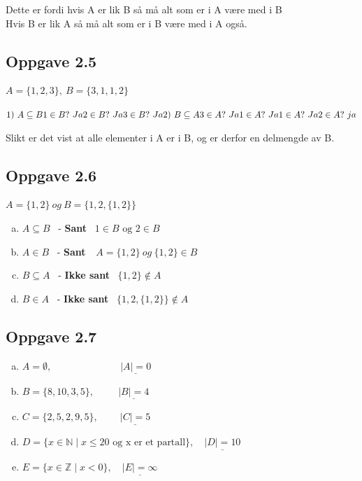 \documentclass{article}
\begin{document}
Dette er fordi hvis A er lik B så må alt som er i A være med i  B\\
Hvis B er lik A så må alt som er i B være med i A også.\\

\subsection*{Oppgave 2.5}

\(A = \{1, 2, 3\}, \  B = \{3, 1, 1, 2\}\)

\(
1) \ A \subseteq B \\ \\
1 \in B ? \ Ja \\
2 \in B ? \ Ja \\
3 \in B ? \ Ja \\ \\
2) \ B \subseteq A \\ \\
3 \in A ? \ Ja \\
1 \in A ? \ Ja \\
1 \in A ? \ Ja \\
2 \in A ? \ ja 
\)

Slikt er det vist at alle elementer i A er i B, og er derfor en delmengde av B.

\subsection*{Oppgave 2.6}
\(A = \{1, 2\} \ og \ B = \{1, 2, \{1, 2\}\}\)

\begin{enumerate}[a.]
\item \(A \subseteq B\) \ - \textbf{Sant} \ \(1 \in B \text{ og } 2 \in B\)
\item \(A \in B\) \ - \textbf{Sant} \ \(\ A = \{1, 2\} \ og \ \{1,2\} \in B\)
\item \(B \subseteq A\) \ - \textbf{Ikke sant} \ \( \{1, 2\} \notin A\)
\item \(B \in A\) \ - \textbf{Ikke sant} \ \(\{1, 2, \{1, 2\}\} \notin A\)
\end{enumerate}

\newpage

\subsection*{Oppgave 2.7}

\begin{enumerate}[a.]
    \item \(A = \emptyset, \qquad\qquad\qquad\quad \underline{|A| = 0}\)
    \item \(B = \{8, 10, 3, 5\}, \quad\quad\ \ \underline{|B| = 4}\)
    \item \(C = \{2, 5, 2, 9, 5\}, \qquad \ \underline{|C| = 5}\)
    \item \(D = \{x \in \mathbb{N} \mid x \le 20 \text{ og x er et partall}\}, \quad \underline{|D| = 10}\)
    \item \(E = \{x \in \mathbb{Z} \mid x < 0\}, \quad \underline{|E| = \infty}\)
\end{enumerate}
\end{document}
